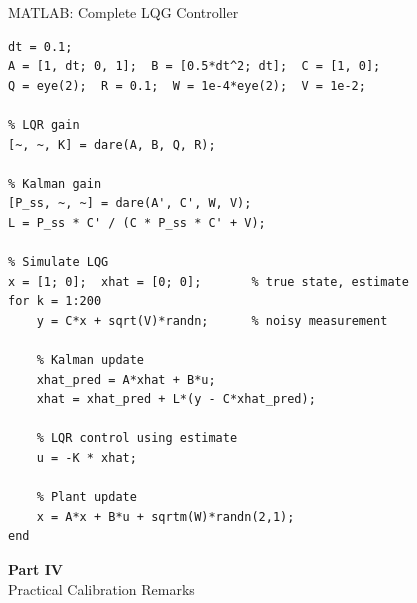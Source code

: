 \documentclass[aspectratio=169,11pt]{beamer}
\begin{document}
\begin{frame}[fragile,shrink=10]{MATLAB: Complete LQG Controller}
\begin{lstlisting}[style=matlab]
% System
dt = 0.1;
A = [1, dt; 0, 1];  B = [0.5*dt^2; dt];  C = [1, 0];
Q = eye(2);  R = 0.1;  W = 1e-4*eye(2);  V = 1e-2;

% LQR gain
[~, ~, K] = dare(A, B, Q, R);

% Kalman gain
[P_ss, ~, ~] = dare(A', C', W, V);
L = P_ss * C' / (C * P_ss * C' + V);

% Simulate LQG
x = [1; 0];  xhat = [0; 0];       % true state, estimate
for k = 1:200
    y = C*x + sqrt(V)*randn;      % noisy measurement

    % Kalman update
    xhat_pred = A*xhat + B*u;
    xhat = xhat_pred + L*(y - C*xhat_pred);

    % LQR control using estimate
    u = -K * xhat;

    % Plant update
    x = A*x + B*u + sqrtm(W)*randn(2,1);
end
\end{lstlisting}
\end{frame}


\begin{frame}{}
\centering
\vfill
{\Huge\bfseries Part IV}\\[12pt]
{\Large Practical Calibration Remarks}
\vfill
\end{frame}
\end{document}
